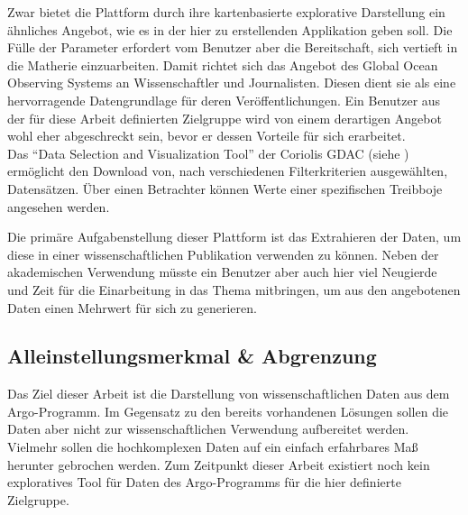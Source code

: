 Zwar bietet die Plattform durch ihre kartenbasierte explorative Darstellung ein ähnliches Angebot, wie es in der hier zu erstellenden Applikation geben soll. Die Fülle der Parameter erfordert vom Benutzer aber die Bereitschaft, sich vertieft in die Matherie einzuarbeiten. Damit richtet sich das Angebot des Global Ocean Observing Systems an Wissenschaftler und Journalisten. Diesen dient sie als eine hervorragende Datengrundlage für deren Veröffentlichungen. Ein Benutzer aus der für diese Arbeit definierten Zielgruppe wird von einem derartigen Angebot wohl eher abgeschreckt sein, bevor er dessen Vorteile für sich erarbeitet. 
\\

Das "`Data Selection and Visualization Tool"' der Coriolis GDAC (siehe \cite{ArgoDataSelection}) ermöglicht den Download von, nach verschiedenen Filterkriterien ausgewählten, Datensätzen. Über einen Betrachter können Werte einer spezifischen Treibboje angesehen werden.

Die primäre Aufgabenstellung dieser Plattform ist das Extrahieren der Daten, um diese in einer wissenschaftlichen Publikation verwenden zu können. Neben der akademischen Verwendung müsste ein Benutzer aber auch hier viel Neugierde und Zeit für die Einarbeitung in das Thema mitbringen, um aus den angebotenen Daten einen Mehrwert für sich zu generieren. 


\subsection{Alleinstellungsmerkmal \& Abgrenzung}

Das Ziel dieser Arbeit ist die Darstellung von wissenschaftlichen Daten aus dem Argo-Programm. Im Gegensatz zu den bereits vorhandenen Lösungen sollen die Daten aber nicht zur wissenschaftlichen Verwendung aufbereitet werden. Vielmehr sollen die hochkomplexen Daten auf ein einfach erfahrbares Maß herunter gebrochen werden. Zum Zeitpunkt dieser Arbeit existiert noch kein exploratives Tool für Daten des Argo-Programms für die hier definierte Zielgruppe.


